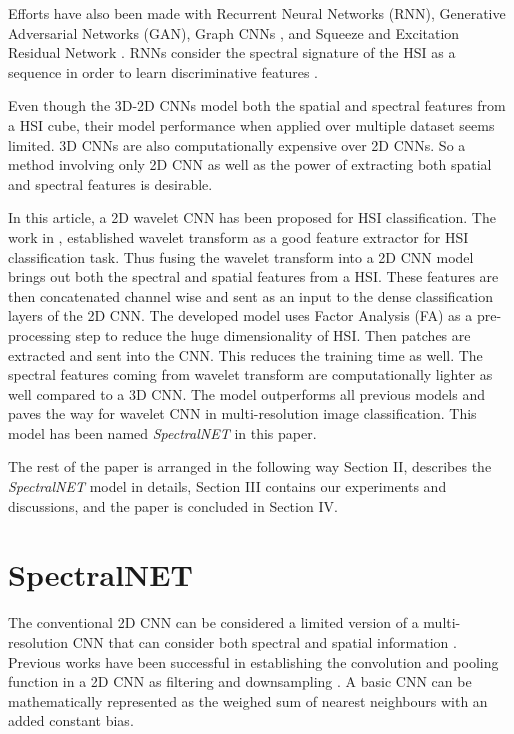 \documentclass[journal]{IEEEtran}
\begin{document}
Efforts have also been made with Recurrent Neural Networks (RNN), Generative Adversarial Networks (GAN), Graph CNNs \cite{9091940}, and Squeeze and Excitation Residual Network \cite{wang2019spatial}. RNNs consider the spectral signature of the HSI as a sequence in order to learn discriminative features \cite{8662780}. 

Even though the 3D-2D CNNs model both the spatial and spectral features from a HSI cube, their model performance when applied over multiple dataset seems limited. 3D CNNs are also computationally expensive over 2D CNNs. So a method involving only 2D CNN as well as the power of extracting both spatial and spectral features is desirable. 

In this article, a 2D wavelet CNN has been proposed for HSI classification. The work in \cite{PRABHAKAR201737}, established wavelet transform as a good feature extractor for HSI classification task. Thus fusing the wavelet transform into a 2D CNN model brings out both the spectral and spatial features from a HSI. These features are then concatenated channel wise and sent as an input to the dense classification layers of the 2D CNN. The developed model uses Factor Analysis (FA) as a pre-processing step to reduce the huge dimensionality of HSI. Then patches are extracted and sent into the CNN. This reduces the training time as well. The spectral features coming from wavelet transform are computationally lighter as well compared to a 3D CNN. The model outperforms all previous models and paves the way for wavelet CNN in multi-resolution image classification. This model has been named \textit{SpectralNET} in this paper.  

The rest of the paper is arranged in the following way Section II, describes the \textit{SpectralNET} model in details, Section III contains our experiments and discussions, and the paper is concluded in Section IV.

\section{SpectralNET}

The conventional 2D CNN can be considered a limited version of a multi-resolution CNN that can consider both spectral and spatial information \cite{fujieda2018wavelet}. Previous works have been successful in establishing the convolution and pooling function in a 2D CNN as filtering and downsampling \cite{fujieda2017wavelet}. A basic CNN can be mathematically represented as the weighed sum of nearest neighbours with an added constant bias. 
\end{document}
